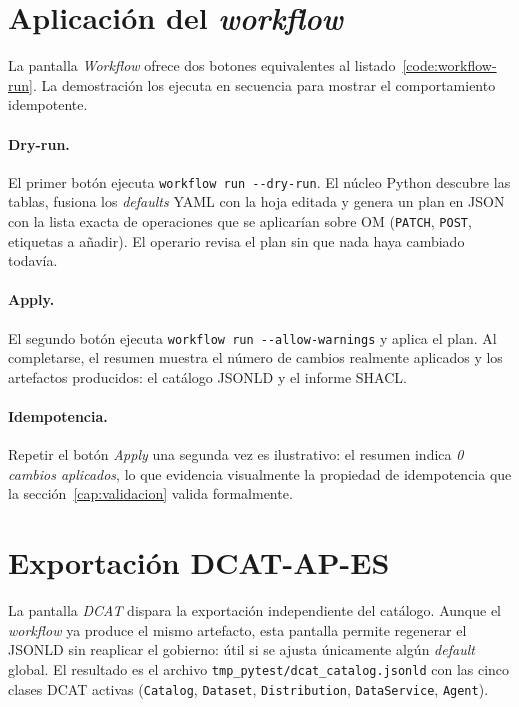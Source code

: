 \section{Aplicación del \emph{workflow}}\label{sec:demo-workflow}

La pantalla \emph{Workflow} ofrece dos botones equivalentes al listado~\ref{code:workflow-run}. La demostración los ejecuta en secuencia para mostrar el comportamiento idempotente.

\paragraph{Dry-run.} El primer botón ejecuta \texttt{workflow run -{}-dry-run}. El núcleo Python descubre las tablas, fusiona los \emph{defaults} \ac{YAML} con la hoja editada y genera un plan en \ac{JSON} con la lista exacta de operaciones que se aplicarían sobre \ac{OM} (\texttt{PATCH}, \texttt{POST}, etiquetas a añadir). El operario revisa el plan sin que nada haya cambiado todavía.

\paragraph{Apply.} El segundo botón ejecuta \texttt{workflow run -{}-allow-warnings} y aplica el plan. Al completarse, el resumen muestra el número de cambios realmente aplicados y los artefactos producidos: el catálogo \ac{JSONLD} y el informe \ac{SHACL}.

\paragraph{Idempotencia.} Repetir el botón \emph{Apply} una segunda vez es ilustrativo: el resumen indica \emph{0 cambios aplicados}, lo que evidencia visualmente la propiedad de idempotencia que la sección~\ref{cap:validacion} valida formalmente.


\section{Exportación DCAT-AP-ES}\label{sec:demo-dcat}

La pantalla \emph{DCAT} dispara la exportación independiente del catálogo. Aunque el \emph{workflow} ya produce el mismo artefacto, esta pantalla permite regenerar el \ac{JSONLD} sin reaplicar el gobierno: útil si se ajusta únicamente algún \emph{default} global. El resultado es el archivo \texttt{tmp\_pytest/dcat\_catalog.jsonld} con las cinco clases \ac{DCAT} activas (\texttt{Catalog}, \texttt{Dataset}, \texttt{Distribution}, \texttt{DataService}, \texttt{Agent}).


